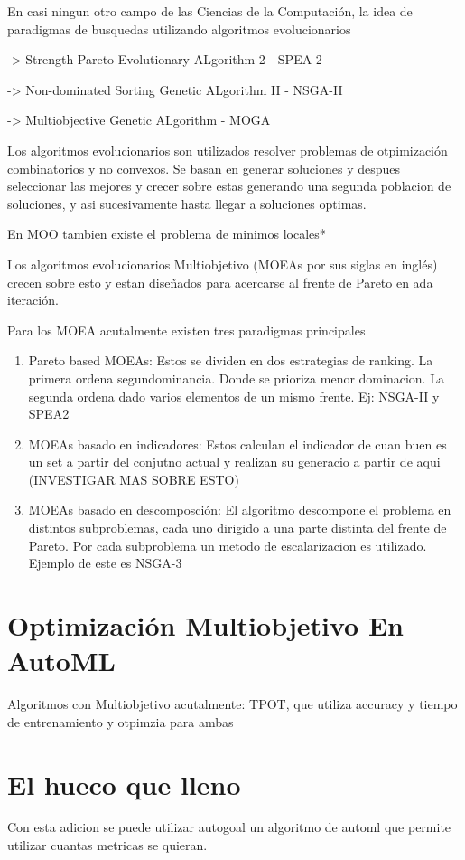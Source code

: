 En casi ningun otro campo de las Ciencias de la Computaci\'on, la idea de paradigmas de busquedas utilizando algoritmos evolucionarios

-> Strength Pareto Evolutionary ALgorithm 2 - SPEA 2

-> Non-dominated Sorting Genetic ALgorithm II - NSGA-II

-> Multiobjective  Genetic ALgorithm - MOGA


Los algoritmos evolucionarios son utilizados resolver problemas de otpimizaci\'on combinatorios y no convexos. Se basan en generar soluciones y despues seleccionar las mejores y crecer sobre estas generando una segunda poblacion de soluciones, y asi sucesivamente hasta llegar a soluciones optimas.

En MOO tambien existe el problema de minimos locales*

Los algoritmos evolucionarios Multiobjetivo (MOEAs por sus siglas en ingl\'es) crecen sobre esto y estan diseñados para acercarse al frente de Pareto en ada iteraci\'on.

Para los MOEA acutalmente existen tres paradigmas principales
\begin{enumerate}
    \item Pareto based MOEAs: Estos se dividen en dos estrategias de ranking. La primera ordena segundominancia. Donde se prioriza menor dominacion. La segunda ordena dado varios elementos de un mismo frente. Ej: NSGA-II y SPEA2
    \item MOEAs basado en indicadores: Estos calculan el indicador de cuan buen es un set a partir del conjutno actual y realizan su generacio a partir de aqui (INVESTIGAR MAS SOBRE ESTO)
    \item MOEAs basado en descomposción: El algoritmo descompone el problema en distintos subproblemas, cada uno dirigido a una parte distinta del frente de Pareto. Por cada subproblema un metodo de escalarizacion es utilizado. Ejemplo de este es NSGA-3
\end{enumerate}


\section*{Optimizaci\'on Multiobjetivo En AutoML}

Algoritmos con Multiobjetivo acutalmente: TPOT, que utiliza accuracy y tiempo de entrenamiento y otpimzia para ambas

\section*{El hueco que lleno}

Con esta adicion se puede utilizar autogoal un algoritmo de automl que permite utilizar cuantas metricas se quieran.
